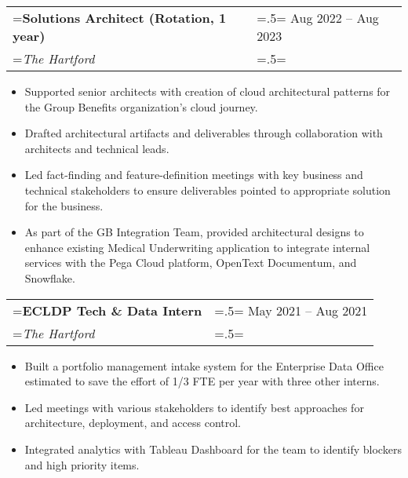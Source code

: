 \documentclass{article}
\begin{document}
\hspace{-1em}
\begin{tabularx}{\textwidth}{
    >{\raggedright\arraybackslash\hsize=1.5\hsize\linewidth=\hsize}X
    >{\raggedleft\arraybackslash\hsize=.5\hsize\linewidth=\hsize}X }
    \textbf{Solutions Architect (Rotation, 1 year)} & Aug 2022 -- Aug 2023\\
    \textit{The Hartford} & \\
\end{tabularx}
\vspace{-.5em}
\begin{itemize}[label={--}, leftmargin=1em]
    \setlength\itemsep{0em}
    \item Supported senior architects with creation of cloud architectural patterns for the Group Benefits organization's cloud journey.
    \item Drafted architectural artifacts and deliverables through collaboration with architects and technical leads.
    \item Led fact-finding and feature-definition meetings with key business and technical stakeholders to ensure deliverables pointed to appropriate solution for the business.
    \item As part of the GB Integration Team, provided architectural designs to enhance existing Medical Underwriting application to integrate internal services with the Pega Cloud platform, OpenText Documentum, and Snowflake.
\end{itemize}

\hspace{-1em}
\begin{tabularx}{\textwidth}{
    >{\raggedright\arraybackslash\hsize=1.5\hsize\linewidth=\hsize}X
    >{\raggedleft\arraybackslash\hsize=.5\hsize\linewidth=\hsize}X }
    \textbf{ECLDP Tech \& Data Intern} & May 2021 -- Aug 2021\\
    \textit{The Hartford} & \\
\end{tabularx}
\vspace{-.5em}
\begin{itemize}[label={--}, leftmargin=1em]
    \setlength\itemsep{0em}
    \item Built a portfolio management intake system for the Enterprise Data Office estimated to save the effort of 1/3 FTE per year with three other interns.
    \item Led meetings with various stakeholders to identify best approaches for architecture, deployment, and access control.
    \item Integrated analytics with Tableau Dashboard for the team to identify blockers and high priority items.
\end{itemize}
\end{document}
